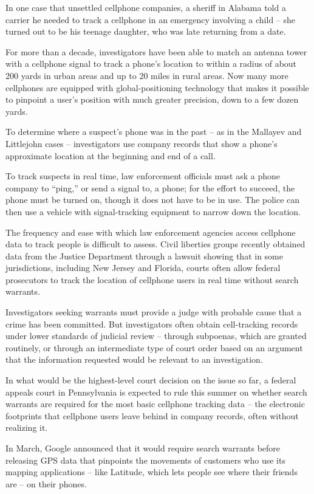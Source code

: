 ﻿\documentclass[12pt]{article}
\begin{document}
In one case that unsettled cellphone companies, a sheriff in Alabama told a carrier he needed to
track a cellphone in an emergency involving a child -- she turned out to be his teenage daughter,
who was late returning from a date.

For more than a decade, investigators have been able to match an antenna tower with a cellphone
signal to track a phone's location to within a radius of about 200 yards in urban areas and up to 20
miles in rural areas. Now many more cellphones are equipped with global-positioning technology that
makes it possible to pinpoint a user's position with much greater precision, down to a few dozen
yards.

To determine where a suspect's phone was in the past -- as in the Mallayev and Littlejohn cases --
investigators use company records that show a phone's approximate location at the beginning and end
of a call.

To track suspects in real time, law enforcement officials must ask a phone company to ``ping,'' or
send a signal to, a phone; for the effort to succeed, the phone must be turned on, though it does
not have to be in use. The police can then use a vehicle with signal-tracking equipment to narrow
down the location.

The frequency and ease with which law enforcement agencies access cellphone data to track people is
difficult to assess. Civil liberties groups recently obtained data from the Justice Department
through a lawsuit showing that in some jurisdictions, including New Jersey and Florida, courts often
allow federal prosecutors to track the location of cellphone users in real time without search
warrants.

Investigators seeking warrants must provide a judge with probable cause that a crime has been
committed. But investigators often obtain cell-tracking records under lower standards of judicial
review -- through subpoenas, which are granted routinely, or through an intermediate type of court
order based on an argument that the information requested would be relevant to an investigation.

In what would be the highest-level court decision on the issue so far, a federal appeals court in
Pennsylvania is expected to rule this summer on whether search warrants are required for the most
basic cellphone tracking data -- the electronic footprints that cellphone users leave behind in
company records, often without realizing it.

In March, Google announced that it would require search warrants before releasing GPS data that
pinpoints the movements of customers who use its mapping applications -- like Latitude, which lets
people see where their friends are -- on their phones.
\end{document}
